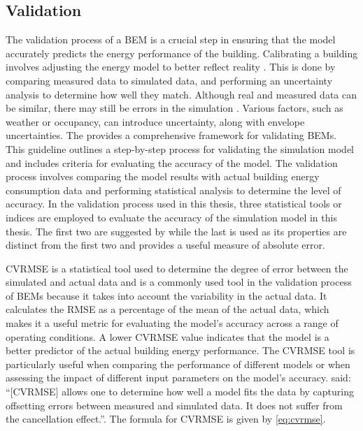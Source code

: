 \subsection{Validation} \label{subsec:validation}
The validation process of a \ac{BEM} is a crucial step in ensuring that the model accurately predicts the energy performance of the building. Calibrating a building involves adjusting the energy model to better reflect reality \cite{coakley_review_2014,farhang2012monitoring}. This is done by comparing measured data to simulated data, and performing an uncertainty analysis to determine how well they match. Although real and measured data can be similar, there may still be errors in the simulation \cite{ashrae_guideline_project_committee_14_ashrae_2014}. Various factors, such as weather \cite{lucas2019methodology} or occupancy, can introduce uncertainty, along with envelope uncertainties. The  \cite{ashrae_guideline_project_committee_14_ashrae_2014} provides a comprehensive framework for validating \acp{BEM}. This guideline outlines a step-by-step process for validating the simulation model and includes criteria for evaluating the accuracy of the model. The validation process involves comparing the model results with actual building energy consumption data and performing statistical analysis to determine the level of accuracy. In the validation process used in this thesis, three statistical tools or indices are employed to evaluate the accuracy of the simulation model in this thesis. The first two are suggested by  while the last is used as its properties are distinct from the first two and provides a useful measure of absolute error.


\ac{CVRMSE} is a statistical tool used to determine the degree of error between the simulated and actual data and is a commonly used tool in the validation process of \acp{BEM} because it takes into account the variability in the actual data. It calculates the \ac{RMSE} as a percentage of the mean of the actual data, which makes it a useful metric for evaluating the model's accuracy across a range of operating conditions. A lower \ac{CVRMSE} value indicates that the model is a better predictor of the actual building energy performance. The \ac{CVRMSE} tool is particularly useful when comparing the performance of different models or when assessing the impact of different input parameters on the model's accuracy. \citeauthor{coakley_review_2014} \cite{coakley_review_2014} said: ``[\ac{CVRMSE}] allows one to determine how well a model fits the data by capturing offsetting errors between measured and simulated data. It does not suffer from the cancellation effect.''. The formula for \ac{CVRMSE} is given by \cref{eq:cvrmse}.

